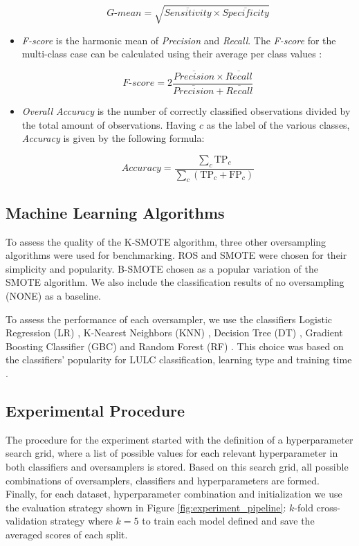 \documentclass[remotesensing,article,submit,moreauthors,pdftex]{Definitions/mdpi}
\begin{document}
\begin{paracol}{2}
\begin{itemize}
	      $$\textit{G-mean} = \sqrt{ \overline{Sensitivity} \times
			      \overline{Specificity}}$$

	\item \textit{F-score} is the harmonic mean of \textit{Precision} and
	      \textit{Recall}. The \textit{F-score} for the multi-class case can
	      be calculated using their average per class values \cite{He2009}:

	      $$\textit{F-score}=2\frac{\overline{Precision} \times \overline{Recall}}{\overline{Precision} +
			      \overline{Recall}}$$

	\item \textit{Overall Accuracy} is the number of correctly classified observations
	      divided by the total amount of observations. Having \( c \) as the label of the
	      various classes, \textit{Accuracy} is given by the following formula:

	      $$\textit{Accuracy} = \frac{ \sum\limits_{c}{ \text{TP}_{c} } }{
			      \sum\limits_{c}{ (\text{TP}_{c}  + \text{FP}_{c}) } } $$

\end{itemize}

\subsection{Machine Learning Algorithms}

To assess the quality of the K-SMOTE algorithm, three other oversampling
algorithms were used for benchmarking. ROS and SMOTE were chosen for their
simplicity and popularity. B-SMOTE chosen as a popular
variation of the SMOTE algorithm. We also include the classification
results of no oversampling (NONE) as a baseline.

To assess the performance of each oversampler, we use the classifiers Logistic
Regression (LR) \cite{Nelder1972}, K-Nearest Neighbors (KNN)
\cite{Cover1967}, Decision Tree (DT) \cite{Salzberg1994}, Gradient Boosting
Classifier (GBC) \cite{Friedman2001} and Random Forest (RF) \cite{Liaw2002}.
This choice was based on the classifiers' popularity for LULC classification,
learning type and training time \cite{Maxwell2018,Gavade2019}.

\subsection{Experimental Procedure}

The procedure for the experiment started with the definition of a
hyperparameter search grid, where a list of possible values for each relevant
hyperparameter in both classifiers and oversamplers is stored. Based on this
search grid, all possible combinations of oversamplers, classifiers and
hyperparameters are formed.  Finally, for each dataset, hyperparameter
combination and initialization we use the evaluation strategy shown in Figure
\ref{fig:experiment_pipeline}: $k$-fold cross-validation strategy where $k=5$
to train each model defined and save the averaged scores of each split.


\end{paracol}
\end{document}
